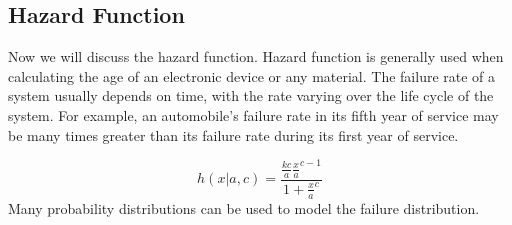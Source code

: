 \documentclass[12pt,a4paper]{article}
\begin{document}
\subsection{Hazard Function}

Now we will discuss the hazard function. Hazard function is generally used when calculating the age of an electronic device or any material. The failure rate of a system usually depends on time, with the rate varying over the life cycle of the system. For example, an automobile's failure rate in its fifth year of service may be many times greater than its failure rate during its first year of service.

\begin{equation}
h(x|a,c)=\frac{\frac{kc}{a}\frac{x}{a}^{c-1}}{1+\frac{x}{a}^{c}}
\end{equation}
Many probability distributions can be used to model the failure distribution.
\end{document}
